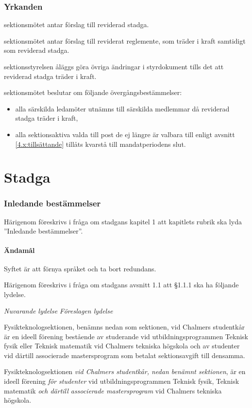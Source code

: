 \documentclass{article}
\newenvironment{lydelse}
    {\begin{paracol}{2}%
        \emph{Nuvarande lydelse}%
        \switchcolumn%
        \emph{Föreslagen lydelse}%
    \end{paracol}%
    \begin{enumerate}[label=\thesubsection.\arabic*]%
    \begin{paracol}{2}%
    }{\end{paracol}\end{enumerate}}
\begin{document}
\section*{Yrkanden}
\begin{beslut}
	\item sektionsmötet antar förslag till reviderad stadga.
	\item sektionsmötet antar förslag till reviderat reglemente, som träder i kraft samtidigt som reviderad stadga.
	\item sektionsstyrelsen åläggs göra övriga ändringar i styrdokument tills det att reviderad stadga träder i kraft.
	\item sektionsmötet beslutar om följande övergångsbestämmelser:
	\begin{itemize}
    \item alla särskilda ledamöter utnämns till särskilda medlemmar då reviderad stadga träder i kraft,
    \item alla sektionsaktiva valda till post de ej längre är valbara till enligt avsnitt \ref{4.x:tillsättande} tillåts kvarstå till mandatperiodens slut.
	\end{itemize}
\end{beslut}

\tableofcontents
\clearpage


\part{Stadga}
\section{Inledande bestämmelser}
Härigenom föreskrivs i fråga om stadgans kapitel 1 att kapitlets rubrik ska lyda ''Inledande bestämmelser''.


\subsection{Ändamål}
Syftet är att förnya språket och ta bort redundans.

Härigenom föreskrivs i fråga om stadgans avsnitt 1.1 att \S 1.1.1 ska ha följande lydelse.

\begin{lydelse}
    \item Fysikteknologsektionen, benämns nedan som sektionen, vid Chalmers studentkår är en ideell förening bestående av studerande vid utbildningsprogrammen Teknisk fysik eller Teknisk matematik vid Chalmers tekniska högskola och av studenter vid därtill associerade mastersprogram som betalat sektionsavgift till densamma.
  \switchcolumn
    \item Fysikteknologsektionen \emph{vid Chalmers studentkår, nedan benämnt sektionen}, är en ideell förening \emph{för studenter} vid utbildningsprogrammen Teknisk fysik, Teknisk matematik \emph{och därtill associerade mastersprogram} vid Chalmers tekniska högskola.
\end{lydelse}
\end{document}
